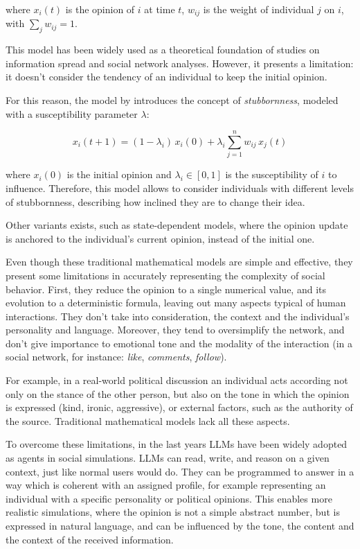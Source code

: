 where $x_i(t)$ is the opinion of $i$ at time $t$, $w_{ij}$ is the weight of individual $j$ on $i$, with $\sum_{j} w_{ij}=1$.

This model has been widely used as a theoretical foundation of studies on information spread and social network analyses. However, it presents a limitation: it doesn’t consider the tendency of an individual to keep the initial opinion.

For this reason, the model by \citet{friedkin_1990} introduces the concept of \textit{stubbornness}, modeled with a susceptibility parameter $\lambda$:

\[
x_i(t+1) = (1 - \lambda_i) \, x_i(0) + \lambda_i \sum_{j=1}^n w_{ij} \, x_j(t)
\]

where $x_i(0)$ is the initial opinion and $\lambda_i \in [0, 1]$ is the susceptibility of $i$ to influence.
Therefore, this model allows to consider individuals with different levels of stubbornness, describing how inclined they are to change their idea.

Other variants exists, such as state-dependent models, where the opinion update is anchored to the individual's current opinion, instead of the initial one.


\medskip
Even though these traditional mathematical models are simple and effective, they present some limitations in accurately representing the complexity of social behavior.
First, they reduce the opinion to a single numerical value, and its evolution to a deterministic formula, leaving out many aspects typical of human interactions.
They don't take into consideration, the context and the individual's personality and language.
Moreover, they tend to oversimplify the network, and don't give importance to emotional tone and the modality of the interaction (in a social network, for instance: \textit{like}, \textit{comments}, \textit{follow}).

For example, in a real-world political discussion an individual acts according not only on the stance of the other person, but also on the tone in which the opinion is expressed (kind, ironic, aggressive), or external factors, such as the authority of the source.
Traditional mathematical models lack all these aspects.


\medskip
To overcome these limitations, in the last years LLMs have been widely adopted as agents in social simulations.
LLMs can read, write, and reason on a given context, just like normal users would do.
They can be programmed to answer in a way which is coherent with an assigned profile, for example representing an individual with a specific personality or political opinions.
This enables more realistic simulations, where the opinion is not a simple abstract number, but is expressed in natural language, and can be influenced by the tone, the content and the context of the received information.

